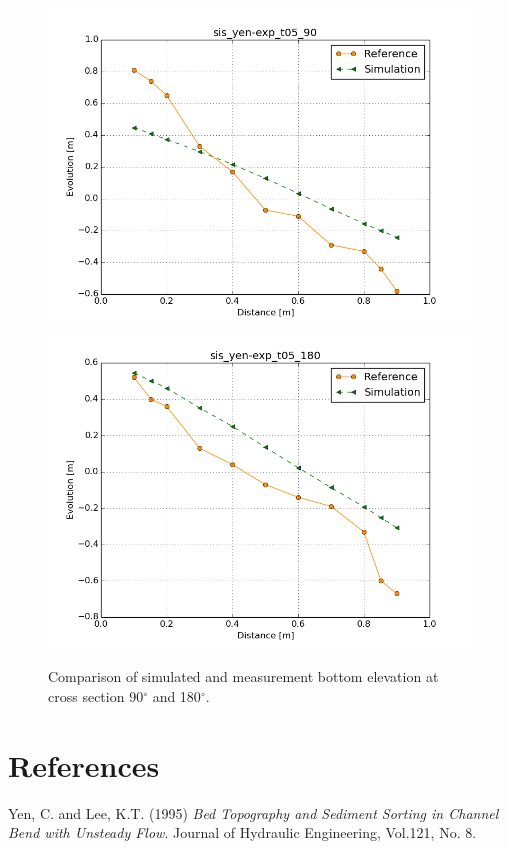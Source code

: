 \begin{figure} [!h]
\centering
\includegraphics[width=.96\textwidth]{../img/sis_yen-exp_90.png}
\includegraphics[width=.96\textwidth]{../img/sis_yen-exp_180.png}
 \caption{Comparison of simulated and measurement bottom elevation at cross section 90$^{\circ}$ and 180$^{\circ}$.}\label{fig:results2}
\end{figure}



\section{References}
%
Yen, C. and Lee, K.T. (1995) \textit{ Bed Topography and Sediment Sorting in Channel Bend
with Unsteady Flow}. Journal of Hydraulic Engineering, Vol.121, No. 8.
